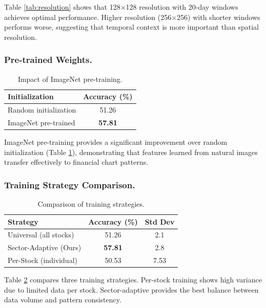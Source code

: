 \documentclass[runningheads]{llncs}
\begin{document}
Table \ref{tab:resolution} shows that 128$\times$128 resolution with 20-day windows achieves optimal performance. Higher resolution (256$\times$256) with shorter windows performs worse, suggesting that temporal context is more important than spatial resolution.

\subsubsection{Pre-trained Weights.}

\begin{table}[h]
\centering
\caption{Impact of ImageNet pre-training.}
\label{tab:pretrain}
\begin{tabular}{@{}lc@{}}
\toprule
\textbf{Initialization} & \textbf{Accuracy (\%)} \\
\midrule
Random initialization & 51.26 \\
ImageNet pre-trained & \textbf{57.81} \\
\bottomrule
\end{tabular}
\end{table}

ImageNet pre-training provides a significant improvement over random initialization (Table \ref{tab:pretrain}), demonstrating that features learned from natural images transfer effectively to financial chart patterns.

\subsubsection{Training Strategy Comparison.}

\begin{table}[h]
\centering
\caption{Comparison of training strategies.}
\label{tab:strategy}
\begin{tabular}{@{}lcc@{}}
\toprule
\textbf{Strategy} & \textbf{Accuracy (\%)} & \textbf{Std Dev} \\
\midrule
Universal (all stocks) & 51.26 & 2.1 \\
Sector-Adaptive (Ours) & \textbf{57.81} & 2.8 \\
Per-Stock (individual) & 50.53 & 7.53 \\
\bottomrule
\end{tabular}
\end{table}

Table \ref{tab:strategy} compares three training strategies. Per-stock training shows high variance due to limited data per stock. Sector-adaptive provides the best balance between data volume and pattern consistency.
\end{document}

